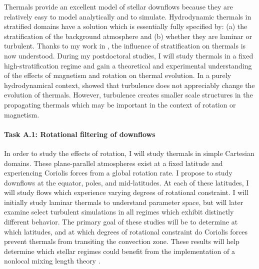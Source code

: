 \documentclass[aasms,11pt, longbibliography]{article}
\begin{document}
Thermals provide an excellent model of stellar downflows because they are relatively easy to model analytically and to simulate.
Hydrodynamic thermals in stratified domains have a solution which is essentially fully specified by: (a) the stratification of the background atmosphere and (b) whether they are laminar or turbulent.
Thanks to my work in \citet{andersLB2019}, the influence of stratification on thermals is now understood.
During my postdoctoral studies, I will study thermals in a fixed high-stratification regime and gain a theoretical and experimental understanding of the effects of magnetism and rotation on thermal evolution.
In a purely hydrodynamical context, \citet{lecoanet&jeevanjee2019} showed that turbulence does not appreciably change the evolution of thermals.
However, turbulence creates smaller scale structures in the propagating thermals which may be important in the context of rotation or magnetism.

\paragraph{Task A.1: Rotational filtering of downflows}
\label{sct:taskA1}
In order to study the effects of rotation, I will study thermals in simple Cartesian domains.
These plane-parallel atmospheres exist at a fixed latitude and experiencing Coriolis forces from a global rotation rate.
I propose to study downflows at the equator, poles, and mid-latitudes.
At each of these latitudes, I will study flows which experience varying degrees of rotational constraint.
I will initially study laminar thermals to understand parameter space, but will later examine select turbulent simulations in all regimes which exhibit distinctly different behavior.
The primary goal of these studies will be to determine at which latitudes, and at which degrees of rotational constraint do Coriolis forces prevent thermals from transiting the convection zone.
These results will help determine which stellar regimes could benefit from the implementation of a nonlocal mixing length theory \citep[as in][]{brandenburg2016}.
\end{document}
